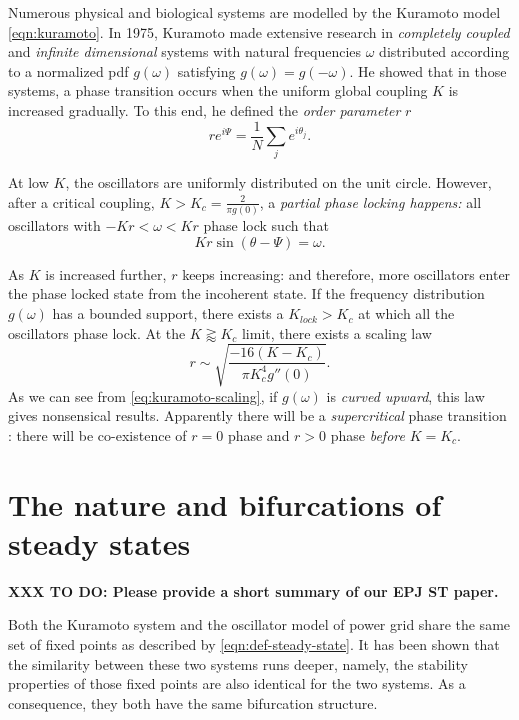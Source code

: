 \documentclass[10pt,aps,pra,onecolumn,superscriptaddress]{revtex4-1}
\begin{document}
Numerous physical and biological systems are modelled by the Kuramoto model 
\eqref{eqn:kuramoto}. In 1975, Kuramoto made extensive research in \emph{completely coupled }
and \emph{infinite dimensional} systems with natural frequencies $\omega$ distributed according to a 
normalized pdf $g(\omega)$ satisfying $g(\omega)=g(-\omega)$.  He showed that in those systems, a phase transition occurs 
when the uniform global coupling $K$ is increased gradually. To this end, he 
defined the \emph{order parameter} $r$
\begin{equation}
\label{eq:kuramoto_r}
re^{i\Psi}=\frac{1}{N}\sum_j e^{i\theta_j}. 
\end{equation}

At low $K$, the 
oscillators are uniformly distributed on 
the unit circle.  However, after a critical coupling, 
$K>K_c=\frac{2}{\pi g(0)}$, a \emph{partial phase locking happens:} all 
oscillators with $-Kr<\omega<Kr$ phase lock such that
\begin{equation}
Kr\sin{(\theta-\Psi)}=\omega.  
\end{equation}

As $K$ is increased further, $r$ keeps increasing: and therefore, more 
oscillators enter the phase locked state from the incoherent state.  If the 
frequency distribution $g(\omega)$ has a bounded support, there exists a 
$K_{lock}>K_c$ at which all the oscillators phase lock.  At the 
$K\gtrapprox K_c$ limit, there exists a scaling law
\begin{equation}
\label{eq:kuramoto-scaling}
r\sim\sqrt{\frac{-16(K-K_c)}{\pi K_c^4g''(0)}}. 
\end{equation}
As we can see from \eqref{eq:kuramoto-scaling}, if $g(\omega)$ is \emph{curved 
upward}, this law gives nonsensical results.   Apparently there will be a \emph{supercritical} phase transition 
\cite[p.~6]{acebron2005kuramoto}: there will be  co-existence of $r=0$ phase 
and $r>0$ phase \emph{before} $K=K_c$.  

\section{The nature and bifurcations of steady states}
\textbf{XXX TO DO: Please provide a short summary of
our EPJ ST paper.}


Both the Kuramoto system and the oscillator model of 
power grid share the same set of fixed points as described by \eqref{eqn:def-steady-state}. It has been shown 
\cite{epjst14} that the similarity between these two systems runs 
deeper, namely, the stability properties of those fixed points are also identical 
for the two systems.  As a consequence, they both have the same bifurcation structure.   
\end{document}
